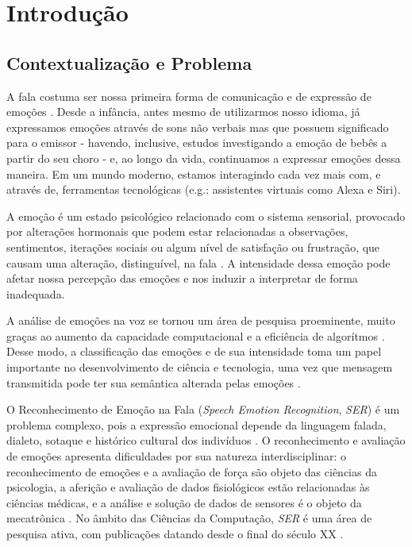 \chapter{Introdução}\label{Cap:Introdução}

\section{Contextualização e Problema}

A fala costuma ser nossa primeira forma de comunicação e de expressão de emoções \cite{1.5}. Desde a infância, antes mesmo de utilizarmos nosso idioma, já expressamos emoções através de sons não verbais mas que possuem significado para o emissor - havendo, inclusive, estudos investigando a emoção de bebês a partir do seu choro \cite{0} - e, ao longo da vida, continuamos a expressar emoções dessa maneira. Em um mundo moderno, estamos interagindo cada vez mais com, e através de, ferramentas tecnológicas (e.g.: assistentes virtuais como Alexa e Siri).

A emoção é um estado psicológico relacionado com o sistema sensorial, provocado por alterações hormonais que podem estar relacionadas a observações, sentimentos, iterações sociais ou algum nível de satisfação ou frustração, que causam uma alteração, distinguível, na fala \cite{8}. A intensidade dessa emoção pode afetar nossa percepção das emoções \cite{18.46} e nos induzir a interpretar de forma inadequada.

A análise de emoções na voz se tornou um área de pesquisa proeminente, muito graças ao aumento da capacidade computacional e a eficiência de algorítmos \cite{38} \cite{20}. Desse modo, a classificação das emoções e de sua intensidade toma um papel importante \cite{3} no desenvolvimento de ciência e tecnologia, uma vez que mensagem transmitida pode ter sua semântica alterada pelas emoções \cite{39}.

O Reconhecimento de Emoção na Fala (\textit{Speech Emotion Recognition}, \textit{SER}) é um problema complexo, pois a expressão emocional depende da linguagem falada, dialeto, sotaque e histórico cultural dos indivíduos \cite{6}. O reconhecimento e avaliação de emoções apresenta dificuldades por sua natureza interdisciplinar: o reconhecimento de emoções e a avaliação de força são objeto das ciências da psicologia, a aferição e avaliação de dados fisiológicos estão relacionadas às ciências médicas, e a análise e solução de dados de sensores é o objeto da mecatrônica \cite{17}. No âmbito das Ciências da Computação, \textit{SER} é uma área de pesquisa ativa, com publicações datando desde o final do século XX \cite{12.27}.

